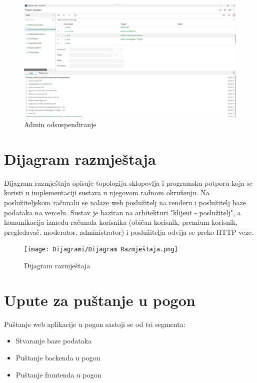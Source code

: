  			\begin{figure}[H]
 				\includegraphics[width=\textwidth]{Slike/AdminSuspendiranogKorisnikaOdsuspendiraj.png}
 				\caption{Admin odsuspendiranje}
 			\end{figure}
 		
		 	
			
			\eject 
		
			
		\section{Dijagram razmještaja}
			
			 \indent Dijagram razmještaja opisuje topologiju sklopovlja i programsku potporu koja se koristi u implementaciji sustava u njegovom radnom okruženju. Na poslužiteljskom računalu se nalaze web poslužitelj na renderu i poslužitelj baze podataka na vercelu. Sustav je baziran na arhitekturi "klijent - poslužitelj", a komunikacija između računala korisnika (običan korisnik, premium korisnik, pregledavač, moderator, administrator) i poslužitelja odvija se preko HTTP veze.
			 
			 \begin{figure}[H]
			 	\texttt{[image: Dijagrami/Dijagram Razmještaja.png]}
			 	\caption{Dijagram razmještaja}
			 \end{figure}
			
			\eject 
		
		\section{Upute za puštanje u pogon}
		
			\indent Puštanje web aplikacije u pogon sastoji se od tri segmenta:
			\begin{itemize}
				\item Stvaranje baze podataka
				\item Puštanje backenda u pogon
				\item Puštanje frontenda u pogon
			\end{itemize}
		
